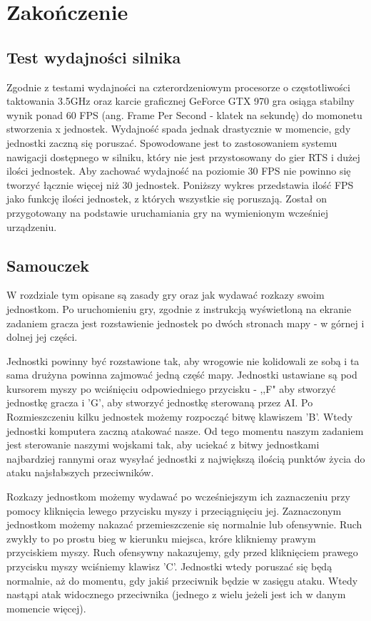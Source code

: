 \documentclass[12pt]{report}
\begin{document}
\chapter{Zakończenie}
\section{Test wydajności silnika}

Zgodnie z testami wydajności na czterordzeniowym procesorze o częstotliwości taktowania 3.5GHz oraz karcie graficznej GeForce GTX 970 gra osiąga stabilny wynik ponad 60 FPS (ang. Frame Per Second - klatek na sekundę) do momonetu stworzenia x jednostek. Wydajność spada jednak drastycznie w momencie, gdy jednostki zaczną się poruszać. Spowodowane jest to zastosowaniem systemu nawigacji dostępnego w silniku, który nie jest przystosowany do gier RTS i dużej ilości jednostek. Aby zachować wydajność na poziomie 30 FPS nie powinno się tworzyć łącznie więcej niż 30 jednostek. Poniższy wykres przedstawia ilość FPS jako funkcję ilości jednostek, z których wszystkie się poruszają. Został on przygotowany na podstawie uruchamiania gry na wymienionym wcześniej urządzeniu. 

\section{Samouczek }
W rozdziale tym opisane są zasady gry oraz jak wydawać rozkazy swoim jednostkom.
Po uruchomieniu gry, zgodnie z instrukcją wyświetloną na ekranie zadaniem gracza jest rozstawienie jednostek po dwóch stronach mapy - w górnej i dolnej jej części. 

Jednostki powinny być rozstawione tak, aby wrogowie nie kolidowali ze sobą i ta sama drużyna powinna zajmować jedną część mapy. Jednostki ustawiane są pod kursorem myszy po wciśnięciu odpowiedniego przycisku - ,,F" aby stworzyć jednostkę gracza i 'G', aby stworzyć jednostkę sterowaną przez AI. Po Rozmieszczeniu kilku jednostek możemy rozpocząć bitwę klawiszem 'B'. Wtedy jednostki komputera zaczną atakować nasze. Od tego momentu naszym zadaniem jest sterowanie naszymi wojskami tak, aby uciekać z bitwy jednostkami najbardziej rannymi oraz wysyłać jednostki z największą ilością punktów życia do ataku najsłabszych przeciwników.

Rozkazy jednostkom możemy wydawać po wcześniejszym ich zaznaczeniu przy pomocy kliknięcia lewego przycisku myszy i przeciągnięciu jej. Zaznaczonym jednostkom możemy nakazać przemieszczenie się normalnie lub ofensywnie. Ruch zwykły to po prostu bieg w kierunku miejsca, króre klikniemy prawym przyciskiem myszy. Ruch ofensywny nakazujemy, gdy przed kliknięciem prawego przycisku myszy wciśniemy klawisz 'C'. Jednostki wtedy poruszać się będą normalnie, aż do momentu, gdy jakiś przeciwnik będzie w zasięgu ataku. Wtedy nastąpi atak widocznego przeciwnika (jednego z wielu jeżeli jest ich w danym momencie więcej).
\end{document}

